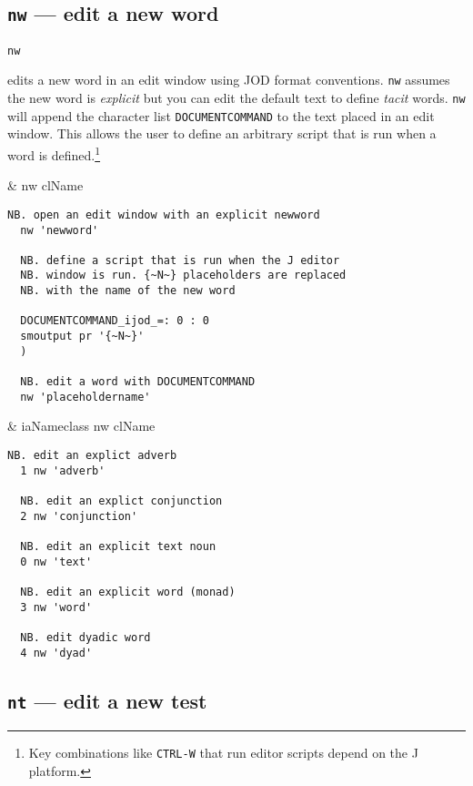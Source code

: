 \subsection{\texttt{nw} --- edit a new word}\label{ss:nw} 

\hypertarget{il:nw}{\texttt{nw}} edits a new  word in 
an edit window using JOD format conventions. \texttt{nw} assumes the
new word is  \emph{explicit} but you can edit the default text to define \emph{tacit} words. 
\texttt{nw} will append the 
character list \texttt{DOCUMENTCOMMAND} to the text placed in an edit window.  
This allows the user to define an arbitrary script that is run when a word is defined.\footnote{Key combinations
like \texttt{CTRL-W} that run editor scripts depend on the J platform.
}

\begin{wordhead}
\monad & nw clName \\
\end{wordhead}
\begin{lstlisting}[frame=single,framerule=0pt] 
  NB. open an edit window with an explicit newword
  nw 'newword'  

  NB. define a script that is run when the J editor
  NB. window is run. {~N~} placeholders are replaced
  NB. with the name of the new word

  DOCUMENTCOMMAND_ijod_=: 0 : 0
  smoutput pr '{~N~}'
  )

  NB. edit a word with DOCUMENTCOMMAND
  nw 'placeholdername'
\end{lstlisting}

\begin{wordhead}
\dyad & iaNameclass nw clName \\
\end{wordhead}
\begin{lstlisting}[frame=single,framerule=0pt]
  NB. edit an explict adverb
  1 nw 'adverb'   

  NB. edit an explict conjunction
  2 nw 'conjunction'  

  NB. edit an explicit text noun
  0 nw 'text'  

  NB. edit an explicit word (monad)
  3 nw 'word'  

  NB. edit dyadic word
  4 nw 'dyad'  
\end{lstlisting}

\subsection{\texttt{nt} --- edit a new test}\label{ss:nt}

